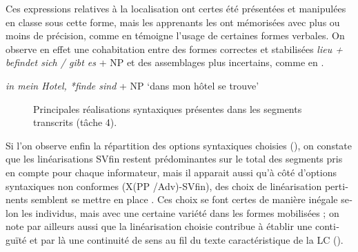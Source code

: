\documentclass[output=paper]{langscibook}
\begin{document}
\begin{otherlanguage}{french}
Ces expressions relatives à la localisation ont certes été présentées et manipulées en classe sous cette forme, mais les apprenants les ont mémorisées avec plus ou moins de précision, comme en témoigne l’usage de certaines formes verbales. On observe en effet une cohabitation entre des formes correctes et stabilisées \textit{lieu + befindet sich / gibt es} + NP et des assemblages plus incertains, comme en . 

\ea%
    \label{ex:felce:16}
    \textit{in mein Hotel, *finde sind} + NP `dans mon hôtel se trouve'
\z


\begin{figure}
\caption{Principales réalisations syntaxiques présentes dans les segments transcrits (tâche 4). \label{fig:felce:7}}
\end{figure}

Si l’on observe enfin la répartition des options syntaxiques choisies (), on constate que les linéarisations SVfin restent prédominantes sur le total des segments pris en compte pour chaque informateur, mais il apparait aussi qu’à côté d’options syntaxiques non conformes (X(PP /Adv)-SVfin), des choix de linéarisation pertinents semblent se mettre en place . Ces choix se font certes de manière inégale selon les individus, mais avec une certaine variété dans les formes mobilisées ; on note par ailleurs aussi que la linéarisation choisie contribue à établir une contiguïté et par là une continuité de sens au fil du texte caractéristique de la LC (\citealt[1642]{ZifonunEtAl1997}).\largerpage


\end{otherlanguage}
\end{document}
